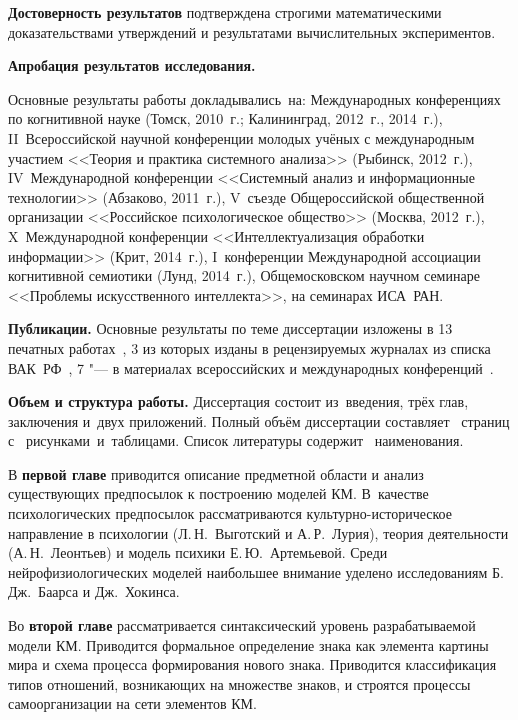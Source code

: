 \textbf{Достоверность результатов} подтверждена строгими математическими доказательствами утверждений и результатами вычислительных экспериментов.

\textbf{Апробация результатов исследования.}

Основные результаты работы докладывались~на: Международных конференциях по когнитивной науке (Томск, 2010~г.; Калининград, 2012~г., 2014~г.), II~Всероссийской научной конференции молодых учёных с международным участием <<Теория и практика системного анализа>> (Рыбинск, 2012~г.), IV~Международной конференции <<Системный анализ и информационные технологии>> (Абзаково, 2011~г.), V~съезде Общероссийской общественной организации <<Российское психологическое общество>> (Москва, 2012~г.), X~Международной конференции <<Интеллектуализация обработки информации>> (Крит, 2014~г.), I~конференции Международной ассоциации когнитивной семиотики (Лунд, 2014~г.), Общемосковском научном семинаре <<Проблемы искусственного интеллекта>>, на семинарах ИСА~РАН.

\textbf{Публикации.} Основные результаты по теме диссертации изложены в 13 печатных работах~\cite{PanovA2011,PanovA2012a,PanovA2012b,PanovA2012c,PanovA2013b,PanovA2014a,PanovT2010b,PanovT2012a,PanovT2012b,PanovT2013,PanovT2014a,PanovT2014b,PanovA2014c,PanovAE2014a}, 3 из которых изданы в рецензируемых журналах из списка ВАК~РФ~\cite{PanovA2012c,PanovA2013b,PanovA2014a}, 7 "--- в материалах всероссийских и международных конференций~\cite{PanovA2011,PanovA2012a,PanovA2012b,PanovT2010b,PanovT2012b,PanovT2014a,PanovT2014b}.

\textbf{Объем и структура работы.} Диссертация состоит из~введения, трёх глав, заключения и~двух приложений. Полный объём диссертации составляет \totalpages\ страниц с \totalfigures\ рисунками\iftotaltables\ и\totaltables\ таблицами\fi. Список литературы содержит \totalcitnums\ наименования.

В \textbf{первой главе} приводится описание предметной области и анализ существующих предпосылок к построению моделей КМ. В~качестве психологических предпосылок рассматриваются культурно-историческое направление в психологии (Л.\,Н.~Выготский и А.\,Р.~Лурия), теория деятельности (А.\,Н.~Леонтьев) и модель психики Е.\,Ю.~Артемьевой. Среди нейрофизиологических моделей наибольшее внимание уделено исследованиям Б.\,Дж.~Баарса и Дж.~Хокинса.

Во \textbf{второй главе} рассматривается синтаксический уровень разрабатываемой модели КМ. Приводится формальное определение знака как элемента картины мира и схема процесса формирования нового знака. Приводится классификация типов отношений, возникающих на множестве знаков, и строятся процессы самоорганизации на сети элементов КМ.

